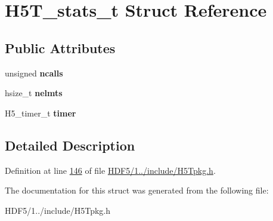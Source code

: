 \hypertarget{struct_h5_t__stats__t}{}\section{H5\+T\+\_\+stats\+\_\+t Struct Reference}
\label{struct_h5_t__stats__t}
\subsection*{Public Attributes}
\begin{DoxyCompactItemize}
\item 
\mbox{\label{struct_h5_t__stats__t_a3db2479b02b6ab38b1017c2953cb02c5}} 
unsigned {\bfseries ncalls}
\item 
\mbox{\label{struct_h5_t__stats__t_afc20b453bb55bd2ce9128355d13f0106}} 
hsize\+\_\+t {\bfseries nelmts}
\item 
\mbox{\label{struct_h5_t__stats__t_ae0e422abce284c56b1f8b311e3f3f507}} 
H5\+\_\+timer\+\_\+t {\bfseries timer}
\end{DoxyCompactItemize}


\subsection{Detailed Description}


Definition at line \hyperlink{_h_d_f5_21_810_81_2include_2_h5_tpkg_8h_source_l00146}{146} of file \hyperlink{_h_d_f5_21_810_81_2include_2_h5_tpkg_8h_source}{H\+D\+F5/1../include/\+H5\+Tpkg.\+h}.



The documentation for this struct was generated from the following file\+:\begin{DoxyCompactItemize}
\item 
H\+D\+F5/1../include/\+H5\+Tpkg.\+h\end{DoxyCompactItemize}
